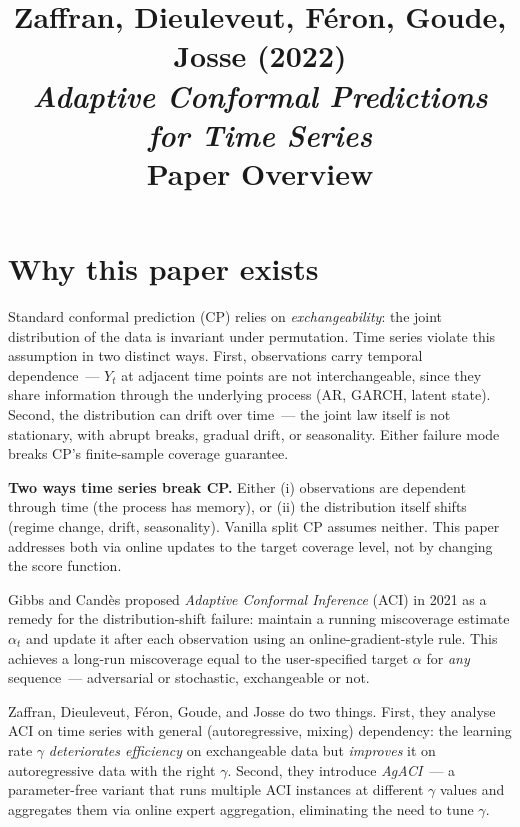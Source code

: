 \documentclass[letterpaper,11pt,leqno]{article}
\title{Zaffran, Dieuleveut, F\'eron, Goude, Josse (2022)\\\textit{Adaptive Conformal Predictions for Time Series}\\[2pt]\large Paper Overview}
\author{}
\date{}
\begin{document}
\maketitle

\section{Why this paper exists}\label{s:intro}

Standard conformal prediction (CP) relies on \emph{exchangeability}: the joint distribution of the data is invariant under permutation. Time series violate this assumption in two distinct ways. First, observations carry temporal dependence~--- $Y_t$ at adjacent time points are not interchangeable, since they share information through the underlying process (AR, GARCH, latent state). Second, the distribution can drift over time~--- the joint law itself is not stationary, with abrupt breaks, gradual drift, or seasonality. Either failure mode breaks CP's finite-sample coverage guarantee.

\begin{keyinsight}
\textbf{Two ways time series break CP.} Either (i) observations are dependent through time (the process has memory), or (ii) the distribution itself shifts (regime change, drift, seasonality). Vanilla split CP assumes neither. This paper addresses both via online updates to the target coverage level, not by changing the score function.
\end{keyinsight}

Gibbs and Cand\`es \cite{gibbs2021aci} proposed \emph{Adaptive Conformal Inference} (ACI) in 2021 as a remedy for the distribution-shift failure: maintain a running miscoverage estimate $\alpha_t$ and update it after each observation using an online-gradient-style rule. This achieves a long-run miscoverage equal to the user-specified target $\alpha$ for \emph{any} sequence~--- adversarial or stochastic, exchangeable or not.

Zaffran, Dieuleveut, F\'eron, Goude, and Josse \cite{zaffran2022aci} do two things. First, they analyse ACI on time series with general (autoregressive, mixing) dependency: the learning rate $\gamma$ \emph{deteriorates efficiency} on exchangeable data but \emph{improves} it on autoregressive data with the right $\gamma$. Second, they introduce \emph{AgACI}~--- a parameter-free variant that runs multiple ACI instances at different $\gamma$ values and aggregates them via online expert aggregation, eliminating the need to tune $\gamma$.
\end{document}
